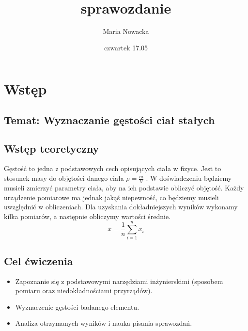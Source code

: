\documentclass{article}
\title{sprawozdanie}
\author{Maria Nowacka}
\date{czwartek 17.05}
\begin{document}
\maketitle

\section{Wstęp}
\subsection{Temat: Wyznaczanie gęstości ciał stałych}

\subsection{Wstęp teoretyczny}
Gęstość to jedna z podstawowych cech opisujących ciała w fizyce. Jest to stosunek masy do objętości danego ciała 
$\rho = \frac{m}{V}$ .
    W doświadczeniu będziemy musieli zmierzyć parametry ciała, aby na ich podstawie obliczyć objętość. Każdy urządzenie pomiarowe ma jednak jakąś niepewność, co będziemy musieli uwzględnić w obliczeniach. Dla uzyskania dokładniejszych wyników wykonamy kilka pomiarów, a następnie obliczymy wartości średnie.
    \begin{equation*}
        \overline{x} = \frac{1}{n}\sum_{i=1}^n x_{i}
    \end{equation*}
    
\subsection{Cel ćwiczenia} 
\begin{itemize}
    \item Zapoznanie się z podstawowymi narzędziami inżynierskimi (sposobem pomiaru oraz niedokładnościami przyrządów).
    \item Wyznaczenie gęstości badanego elementu. 
    \item Analiza otrzymanych wyników i nauka pisania sprawozdań.
\end{itemize}
\end{document}
